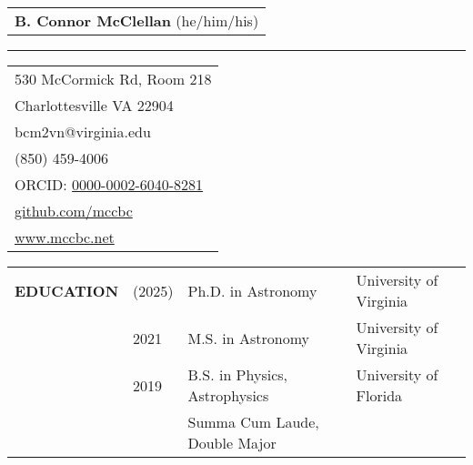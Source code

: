 \documentclass{article}
\begin{document}
\thispagestyle{empty}

\begin{tabular}{l}
    \large\textbf{B. Connor McClellan} \small(he/him/his)\\
\end{tabular}
\vspace{-0.25cm}
\begin{center}
\rule{0.92\textwidth}{.4pt}    
\end{center}
\vspace{0.1cm}
 
\begin{tabular}{l}
    530 McCormick Rd, Room 218 \\
    Charlottesville VA 22904 \\
    bcm2vn@virginia.edu \\
    (850) 459-4006 \\
     ORCID: \href{https://orcid.org/0000-0002-6040-8281}{0000-0002-6040-8281} \\
     \href{https://github.com/mccbc}{github.com/mccbc} \\
     \href{www.mccbc.net}{www.mccbc.net} \\ 
\end{tabular}

\vspace{0.5cm}
\begin{tabular}{p{4cm}p{2.2cm}ll}
    \large{\textbf{EDUCATION}} & (2025) & Ph.D. in Astronomy & University of Virginia \\
                    & 2021 & M.S. in Astronomy & University of Virginia \\
                    & 2019 & B.S. in Physics, Astrophysics &  University of Florida \\
        & & \small Summa Cum Laude, Double Major &  \vspace{0.125cm} \\
\end{tabular}
\end{document}
